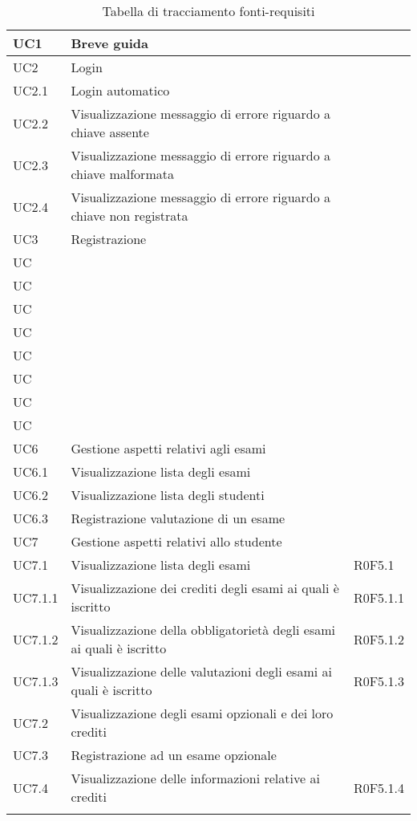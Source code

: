 \documentclass[AnalisiDeiRequisiti.tex]{subfiles}
\begin{document}
\begin{longtable}[H]{|p{2cm}|p{5cm}|p{5cm}|}
	UC1 & Breve guida &  \\ \hline
	UC2 & Login &  \\ \hline
	UC2.1 & Login automatico &  \\ \hline
	UC2.2 & Visualizzazione messaggio di errore riguardo a chiave assente &  \\ \hline
	UC2.3 & Visualizzazione messaggio di errore riguardo a chiave malformata &  \\ \hline
	UC2.4 & Visualizzazione messaggio di errore riguardo a chiave non registrata &  \\ \hline
	UC3 & Registrazione &  \\ \hline %
	UC &  &  \\ \hline
	UC &  &  \\ \hline
	UC &  &  \\ \hline
	UC &  &  \\ \hline
	UC &  &  \\ \hline
	UC &  &  \\ \hline
	UC &  &  \\ \hline
	UC &  &  \\ \hline
	UC6 & Gestione aspetti relativi agli esami &  \\ \hline
	UC6.1 & Visualizzazione lista degli esami &  \\ \hline
	UC6.2 & Visualizzazione lista degli studenti &  \\ \hline
	UC6.3 & Registrazione valutazione di un esame &  \\ \hline
	UC7 & Gestione aspetti relativi allo studente &  \\ \hline
	UC7.1 & Visualizzazione lista degli esami & R0F5.1 \\ \hline
	UC7.1.1 & Visualizzazione dei crediti degli esami ai quali è iscritto & R0F5.1.1 \\ \hline
	UC7.1.2 & Visualizzazione della obbligatorietà degli esami ai quali è iscritto & R0F5.1.2 \\ \hline
	UC7.1.3 & Visualizzazione delle valutazioni degli esami ai quali è iscritto	& R0F5.1.3 \\ \hline
	UC7.2 & Visualizzazione degli esami opzionali e dei loro crediti &  \\ \hline
	UC7.3 & Registrazione ad un esame opzionale &  \\ \hline
	UC7.4 & Visualizzazione delle informazioni relative ai crediti & R0F5.1.4 \\ \hline
	\caption{Tabella di tracciamento fonti-requisiti}
\end{longtable}
\end{document}
